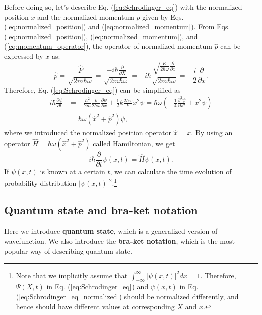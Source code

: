 Before doing so, let's describe Eq. (\ref{eq:Schrodinger_eq}) with the normalized position $x$ and the normalized momentum $p$ given by Eqs. (\ref{eq:normalized_position}) and (\ref{eq:normalized_momentum}). From Eqs. (\ref{eq:normalized_position}), (\ref{eq:normalized_momentum}), and (\ref{eq:momentum_operator}), the operator of normalized momentum $\hat p$ can be expressed by $x$ as:
\begin{equation}
  \hat p = \frac{\hat P}{\sqrt{2m\hbar \omega}} = \frac{-i\hbar \frac{\partial}{\partial X}}{\sqrt{2m\hbar \omega}}
  =-i\hbar \frac{\sqrt{\frac{K}{2\hbar\omega}}\frac{\partial}{\partial x}}{\sqrt{2m\hbar \omega}} = -\frac{i}{2}\frac{\partial}{\partial x}.
\end{equation}
Therefore, Eq. (\ref{eq:Schrodinger_eq}) can be simplified as
\begin{equation}
\begin{aligned}
  i\hbar \frac{\partial \psi}{\partial t} &= -\frac{\hbar^2}{2m}\frac{k}{2\hbar \omega}\frac{\partial \psi}{\partial x} + \frac 1 2 k \frac{2\hbar \omega}{k}x^2 \psi = \hbar \omega \left( -\frac 1 4 \frac{\partial^2\psi}{\partial x^2} + x^2 \psi\right)\\
  &= \hbar \omega (\hat x^2 + \hat p^2)\psi,
  \label{eq:Schrodinger_eq_normalized}
\end{aligned}
\end{equation}
where we introduced the normalized position operator $\hat x = x$. By using an operator $\hat H = \hbar \omega (\hat x^2 + \hat p^2)$ called Hamiltonian, we get
\begin{equation}
  i\hbar \frac{\partial}{\partial t}\psi(x,t) = \hat H\psi(x,t).
\end{equation}
If $\psi(x,t)$ is known at a certain $t$, we can calculate the time evolution of probability distribution $|\psi(x,t)|^2$.\footnote{Note that we implicitly assume that $\int_{-\infty}^{\infty}|\psi(x,t)|^2dx = 1$. Therefore, $\Psi(X, t)$ in Eq. (\ref{eq:Schrodinger_eq}) and $\psi(x,t)$ in Eq. (\ref{eq:Schrodinger_eq_normalized}) should be normalized differently, and hence should have different values at corresponding $X$ and $x$.}

\subsection{Quantum state and bra-ket notation}

Here we introduce \textbf{quantum state}, which is a generalized version of wavefunction. We also introduce the \textbf{bra-ket notation}, which is the most popular way of describing quantum state. 

